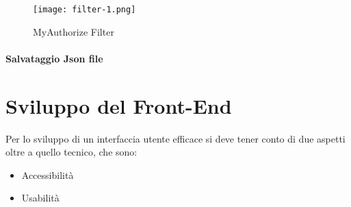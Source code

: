 \begin{figure}[H]
    \centering
    \texttt{[image: filter-1.png]}
    \caption{MyAuthorize Filter}
    \label{fig:Filter1}
\end{figure}


\paragraph {Salvataggio Json file}



\newpage

\section{Sviluppo del Front-End}

Per lo sviluppo di un interfaccia utente efficace si deve tener conto di due aspetti oltre a quello tecnico, che sono:
\begin{itemize}
\item Accessibilità
\item Usabilità
\end{itemize}

